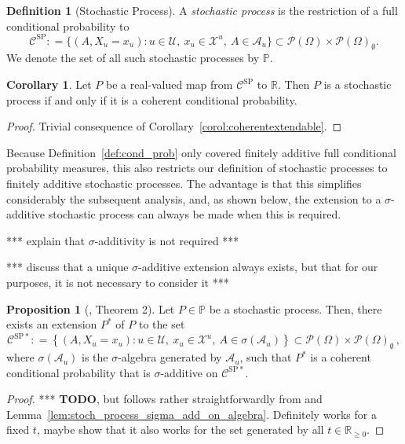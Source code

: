 \documentclass[10pt]{paper}
\theoremstyle{definition}
\newtheorem{proposition}[theorem]{Proposition}
\newtheorem{corollary}[theorem]{Corollary}
\newtheorem{definition}{Definition}
\newcommand{\reals}{\mathbb{R}}
\newcommand{\realsnonneg}{\reals_{\geq 0}}
\newcommand{\states}{\mathcal{X}}
\newcommand{\paths}{\Omega}
\newcommand{\power}{\mathcal{P}(\paths)}
\newcommand{\nonemptypower}{\power_{\emptyset}}
\newcommand{\processes}{\mathbb{P}}
\newcommand{\coloneqq}{:\!=}
\begin{document}
\begin{definition}[Stochastic Process]\label{def:stoch_process}
A \emph{stochastic process} is the restriction of a full conditional probability to
\begin{equation*}
\mathcal{C}^\mathrm{SP}\coloneqq\big\{
(A,X_u=x_u)
\colon
u\in\mathcal{U},~x_u\in\states^u,~A\in\mathcal{A}_u\big\}\subset\power\times\nonemptypower.
\end{equation*}
We denote the set of all such stochastic processes by $\processes$.
\end{definition}

\begin{corollary}\label{corol:processiffcoherent}
Let $P$ be a real-valued map from $\mathcal{C}^\mathrm{SP}$ to $\reals$. Then $P$ is a stochastic process if and only if it is a coherent conditional probability.
\end{corollary}
\begin{proof}
Trivial consequence of Corollary~\ref{corol:coherentextendable}.
\end{proof}

Because Definition~\ref{def:cond_prob} only covered finitely additive full conditional probability measures, this also restricts our definition of stochastic processes to finitely additive stochastic processes. The advantage is that this simplifies considerably the subsequent analysis, and, as shown below, the extension to a $\sigma$-additive stochastic process can always be made when this is required.

*** explain that $\sigma$-additivity is not required ***

*** discuss that a unique $\sigma$-additive extension always exists, but that for our purposes, it is not necessary to consider it ***

\begin{proposition}[\cite{berti2002coherent}, Theorem 2]
Let $P\in\processes$ be a stochastic process. Then, there exists an extension $P^*$ of $P$ to the set
\begin{equation*}
\mathcal{C}^{\mathrm{SP}*} \coloneqq \left\{(A,X_u=x_u)\colon
u\in\mathcal{U},~x_u\in\states^u,~A\in\sigma(\mathcal{A}_u)
\right\}\subset\power\times\nonemptypower\,,
\end{equation*}
where $\sigma(\mathcal{A}_u)$ is the $\sigma$-algebra generated by $\mathcal{A}_u$, such that $P^*$ is a coherent conditional probability that is $\sigma$-additive on $\mathcal{C}^{\mathrm{SP}*}$.
\end{proposition}
\begin{proof}
*** {\bf TODO}, but follows rather straightforwardly from \cite[Theorem 2]{berti2002coherent} and Lemma~\ref{lem:stoch_process_sigma_add_on_algebra}. Definitely works for a fixed $t$, maybe show that it also works for the set generated by all $t\in\realsnonneg$.
\end{proof}
\end{document}
